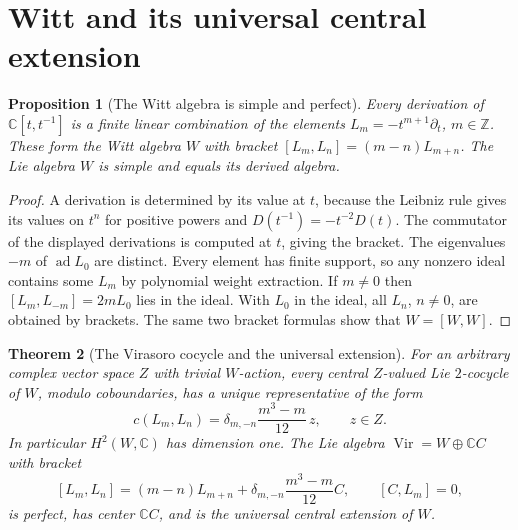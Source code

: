 \documentclass[11pt,oneside,openany]{book}
\newtheorem{theorem}{Theorem}[chapter]
\newtheorem{proposition}[theorem]{Proposition}
\theoremstyle{definition}
\theoremstyle{remark}
\begin{document}
\section{Witt and its universal central extension}

\begin{proposition}[The Witt algebra is simple and perfect]
\label{res:KM10}
Every derivation of \(\mathbb C[t,t^{-1}]\) is a finite linear
combination of the elements \(L_m=-t^{m+1}\partial_t\),
\(m\in\mathbb Z\). These form the Witt algebra \(W\) with bracket
\([L_m,L_n]=(m-n)L_{m+n}\). The Lie algebra \(W\) is simple
and equals its derived algebra.
\end{proposition}

\begin{proof}
A derivation is determined by its value at \(t\), because the
Leibniz rule gives its values on \(t^n\) for positive powers
and \(D(t^{-1})=-t^{-2}D(t)\). The commutator of the
displayed derivations is computed at \(t\), giving the bracket.
The eigenvalues \(-m\) of \(\operatorname{ad}L_0\) are distinct.
Every element has finite support, so any nonzero ideal contains
some \(L_m\) by polynomial weight extraction. If \(m\ne0\)
then \([L_m,L_{-m}]=2mL_0\) lies in the ideal. With \(L_0\)
in the ideal, all \(L_n\), \(n\ne0\), are obtained by brackets.
The same two bracket formulas show that \(W=[W,W]\).
\end{proof}

\begin{theorem}[The Virasoro cocycle and the universal extension]
\label{res:KM11}
For an arbitrary complex vector space \(Z\) with trivial \(W\)-action,
every central \(Z\)-valued Lie \(2\)-cocycle of \(W\), modulo
coboundaries, has a unique representative of the form
\[
 c(L_m,L_n)=\delta_{m,-n}\frac{m^3-m}{12}\,z,\qquad z\in Z.
\]
In particular \(H^2(W,\mathbb C)\) has dimension one.
The Lie algebra \(\operatorname{Vir}=W\oplus\mathbb C C\)
with bracket
\[
 [L_m,L_n]=(m-n)L_{m+n}
             +\delta_{m,-n}\frac{m^3-m}{12}C,\qquad [C,L_m]=0 ,
\]
is perfect, has center \(\mathbb C C\), and is the universal
central extension of \(W\).
\end{theorem}
\end{document}

